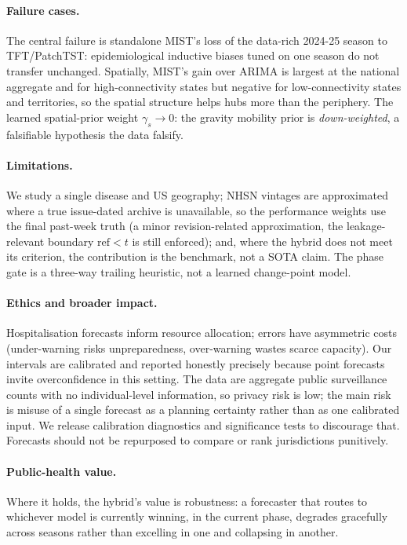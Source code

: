 \documentclass{article}
\begin{document}
\paragraph{Failure cases.} The central failure is standalone MIST's loss of the data-rich 2024-25
season to TFT/PatchTST: epidemiological inductive biases tuned on one season do not transfer
unchanged. Spatially, MIST's gain over ARIMA is largest at the national aggregate and for
high-connectivity states but negative for low-connectivity states and territories, so the spatial
structure helps hubs more than the periphery. The learned spatial-prior weight $\gamma_s\to 0$:
the gravity mobility prior is \emph{down-weighted}, a falsifiable hypothesis the data falsify.

\paragraph{Limitations.} We study a single disease and US geography; NHSN vintages are approximated
where a true issue-dated archive is unavailable, so the performance weights use the final past-week
truth (a minor revision-related approximation, the leakage-relevant boundary $\text{ref}<t$ is
still enforced); and, where the hybrid does not meet its criterion, the contribution is the
benchmark, not a SOTA claim. The phase gate is a three-way trailing heuristic, not a learned
change-point model.

\paragraph{Ethics and broader impact.} Hospitalisation forecasts inform resource allocation;
errors have asymmetric costs (under-warning risks unpreparedness, over-warning wastes scarce
capacity). Our intervals are calibrated and reported honestly precisely because point forecasts
invite overconfidence in this setting. The data are aggregate public surveillance counts with no
individual-level information, so privacy risk is low; the main risk is misuse of a single forecast
as a planning certainty rather than as one calibrated input. We release calibration diagnostics and
significance tests to discourage that. Forecasts should not be repurposed to compare or rank
jurisdictions punitively.

\paragraph{Public-health value.} Where it holds, the hybrid's value is robustness: a forecaster
that routes to whichever model is currently winning, in the current phase, degrades gracefully
across seasons rather than excelling in one and collapsing in another.
\end{document}
